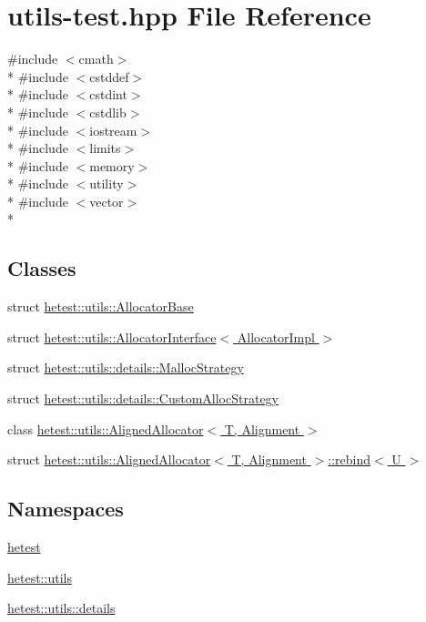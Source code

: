 \hypertarget{utils-test_8hpp}{\section{utils-\/test.hpp File Reference}
\label{utils-test_8hpp}
}
{\ttfamily \#include $<$cmath$>$}\\*
{\ttfamily \#include $<$cstddef$>$}\\*
{\ttfamily \#include $<$cstdint$>$}\\*
{\ttfamily \#include $<$cstdlib$>$}\\*
{\ttfamily \#include $<$iostream$>$}\\*
{\ttfamily \#include $<$limits$>$}\\*
{\ttfamily \#include $<$memory$>$}\\*
{\ttfamily \#include $<$utility$>$}\\*
{\ttfamily \#include $<$vector$>$}\\*
\subsection*{Classes}
\begin{DoxyCompactItemize}
\item 
struct \hyperlink{structhetest_1_1utils_1_1AllocatorBase}{hetest\-::utils\-::\-Allocator\-Base}
\item 
struct \hyperlink{structhetest_1_1utils_1_1AllocatorInterface}{hetest\-::utils\-::\-Allocator\-Interface$<$ Allocator\-Impl $>$}
\item 
struct \hyperlink{structhetest_1_1utils_1_1details_1_1MallocStrategy}{hetest\-::utils\-::details\-::\-Malloc\-Strategy}
\item 
struct \hyperlink{structhetest_1_1utils_1_1details_1_1CustomAllocStrategy}{hetest\-::utils\-::details\-::\-Custom\-Alloc\-Strategy}
\item 
class \hyperlink{classhetest_1_1utils_1_1AlignedAllocator}{hetest\-::utils\-::\-Aligned\-Allocator$<$ T, Alignment $>$}
\item 
struct \hyperlink{structhetest_1_1utils_1_1AlignedAllocator_1_1rebind}{hetest\-::utils\-::\-Aligned\-Allocator$<$ T, Alignment $>$\-::rebind$<$ U $>$}
\end{DoxyCompactItemize}
\subsection*{Namespaces}
\begin{DoxyCompactItemize}
\item 
\hyperlink{namespacehetest}{hetest}
\item 
\hyperlink{namespacehetest_1_1utils}{hetest\-::utils}
\item 
\hyperlink{namespacehetest_1_1utils_1_1details}{hetest\-::utils\-::details}
\end{DoxyCompactItemize}
